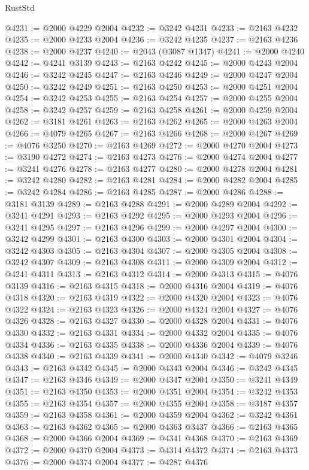 \begin{lexlean}{RustStd}
\begin{coremodule}
{\begin{coremodule}
{{{{{{{{{{{{{{{{{{{{{{{{{{{{{{{@4231 := @2000 @4229 @2004
@4232 := @3242 @4231
@4233 := @2163 @4232
@4235 := @2000 @4233 @2004
@4236 := @3242 @4235
@4237 := @2163 @4236
@4238 := @2000 @4237
@4240 := @2043 (@3087 @1347)
@4241 := @2000 @4240
@4242 := @4241 @3139
@4243 := @2163 @4242
@4245 := @2000 @4243 @2004
@4246 := @3242 @4245
@4247 := @2163 @4246
@4249 := @2000 @4247 @2004
@4250 := @3242 @4249
@4251 := @2163 @4250
@4253 := @2000 @4251 @2004
@4254 := @3242 @4253
@4255 := @2163 @4254
@4257 := @2000 @4255 @2004
@4258 := @3242 @4257
@4259 := @2163 @4258
@4261 := @2000 @4259 @2004
@4262 := @3181 @4261
@4263 := @2163 @4262
@4265 := @2000 @4263 @2004
@4266 := @4079 @4265
@4267 := @2163 @4266
@4268 := @2000 @4267
@4269 := @4076 @3250
@4270 := @2163 @4269
@4272 := @2000 @4270 @2004
@4273 := @3190 @4272
@4274 := @2163 @4273
@4276 := @2000 @4274 @2004
@4277 := @3241 @4276
@4278 := @2163 @4277
@4280 := @2000 @4278 @2004
@4281 := @3242 @4280
@4282 := @2163 @4281
@4284 := @2000 @4282 @2004
@4285 := @3242 @4284
@4286 := @2163 @4285
@4287 := @2000 @4286
@4288 := @3181 @3139
@4289 := @2163 @4288
@4291 := @2000 @4289 @2004
@4292 := @3241 @4291
@4293 := @2163 @4292
@4295 := @2000 @4293 @2004
@4296 := @3241 @4295
@4297 := @2163 @4296
@4299 := @2000 @4297 @2004
@4300 := @3242 @4299
@4301 := @2163 @4300
@4303 := @2000 @4301 @2004
@4304 := @3242 @4303
@4305 := @2163 @4304
@4307 := @2000 @4305 @2004
@4308 := @3242 @4307
@4309 := @2163 @4308
@4311 := @2000 @4309 @2004
@4312 := @4241 @4311
@4313 := @2163 @4312
@4314 := @2000 @4313
@4315 := @4076 @3139
@4316 := @2163 @4315
@4318 := @2000 @4316 @2004
@4319 := @4076 @4318
@4320 := @2163 @4319
@4322 := @2000 @4320 @2004
@4323 := @4076 @4322
@4324 := @2163 @4323
@4326 := @2000 @4324 @2004
@4327 := @4076 @4326
@4328 := @2163 @4327
@4330 := @2000 @4328 @2004
@4331 := @4076 @4330
@4332 := @2163 @4331
@4334 := @2000 @4332 @2004
@4335 := @4076 @4334
@4336 := @2163 @4335
@4338 := @2000 @4336 @2004
@4339 := @4076 @4338
@4340 := @2163 @4339
@4341 := @2000 @4340
@4342 := @4079 @3246
@4343 := @2163 @4342
@4345 := @2000 @4343 @2004
@4346 := @3242 @4345
@4347 := @2163 @4346
@4349 := @2000 @4347 @2004
@4350 := @3241 @4349
@4351 := @2163 @4350
@4353 := @2000 @4351 @2004
@4354 := @3242 @4353
@4355 := @2163 @4354
@4357 := @2000 @4355 @2004
@4358 := @3187 @4357
@4359 := @2163 @4358
@4361 := @2000 @4359 @2004
@4362 := @3242 @4361
@4363 := @2163 @4362
@4365 := @2000 @4363 @3437
@4366 := @2163 @4365
@4368 := @2000 @4366 @2004
@4369 := @4341 @4368
@4370 := @2163 @4369
@4372 := @2000 @4370 @2004
@4373 := @4314 @4372
@4374 := @2163 @4373
@4376 := @2000 @4374 @2004
@4377 := @4287 @4376
}}}}}}}}}}}}}}}}}}}}}}}}}}}}}}}
\end{coremodule}}
\end{coremodule}
\end{lexlean}
